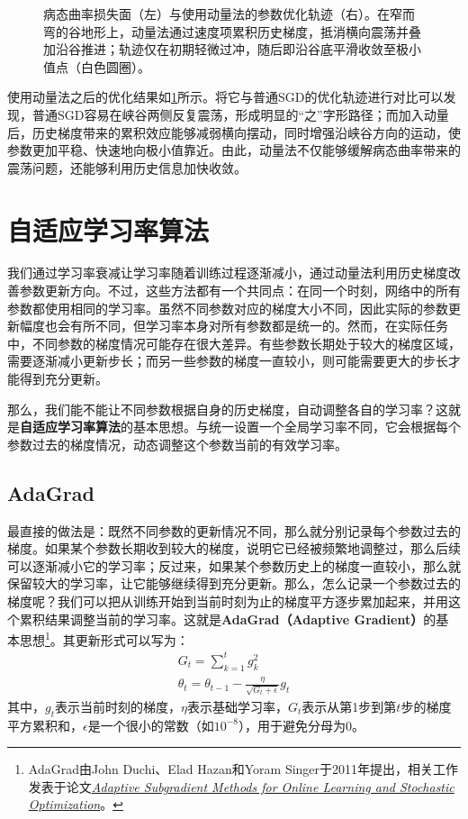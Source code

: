 \begin{figure}[H]
    \caption{病态曲率损失面（左）与使用动量法的参数优化轨迹（右）。在窄而弯的谷地形上，动量法通过速度项累积历史梯度，抵消横向震荡并叠加沿谷推进；轨迹仅在初期轻微过冲，随后即沿谷底平滑收敛至极小值点（白色圆圈）。}
    \label{fig:ill_conditioned_sovled}
\end{figure}

使用动量法之后的优化结果如\cref{fig:ill_conditioned_sovled}所示。将它与普通SGD的优化轨迹进行对比可以发现，普通SGD容易在峡谷两侧反复震荡，形成明显的“之”字形路径；而加入动量后，历史梯度带来的累积效应能够减弱横向摆动，同时增强沿峡谷方向的运动，使参数更加平稳、快速地向极小值靠近。由此，动量法不仅能够缓解病态曲率带来的震荡问题，还能够利用历史信息加快收敛。

\section{自适应学习率算法}

我们通过学习率衰减让学习率随着训练过程逐渐减小，通过动量法利用历史梯度改善参数更新方向。不过，这些方法都有一个共同点：在同一个时刻，网络中的所有参数都使用相同的学习率。虽然不同参数对应的梯度大小不同，因此实际的参数更新幅度也会有所不同，但学习率本身对所有参数都是统一的。然而，在实际任务中，不同参数的梯度情况可能存在很大差异。有些参数长期处于较大的梯度区域，需要逐渐减小更新步长；而另一些参数的梯度一直较小，则可能需要更大的步长才能得到充分更新。

那么，我们能不能让不同参数根据自身的历史梯度，自动调整各自的学习率？这就是\textbf{自适应学习率算法}的基本思想。与统一设置一个全局学习率不同，它会根据每个参数过去的梯度情况，动态调整这个参数当前的有效学习率。

\subsection{AdaGrad}

最直接的做法是：既然不同参数的更新情况不同，那么就分别记录每个参数过去的梯度。如果某个参数长期收到较大的梯度，说明它已经被频繁地调整过，那么后续可以逐渐减小它的学习率；反过来，如果某个参数历史上的梯度一直较小，那么就保留较大的学习率，让它能够继续得到充分更新。那么，怎么记录一个参数过去的梯度呢？我们可以把从训练开始到当前时刻为止的梯度平方逐步累加起来，并用这个累积结果调整当前的学习率。这就是\textbf{AdaGrad（Adaptive Gradient）}的基本思想\footnote{AdaGrad由John Duchi、Elad Hazan和Yoram Singer于2011年提出，相关工作发表于论文\href{http://jmlr.org/papers/v12/duchi11a.html}{\textit{Adaptive Subgradient Methods for Online Learning and Stochastic Optimization}}。}。其更新形式可以写为：
$$
\begin{gathered}
G_t = \sum_{k=1}^{t} g_k^2 \\
\theta_t = \theta_{t-1} - \frac{\eta}{\sqrt{G_t+\epsilon}}g_t
\end{gathered}
$$
其中，$g_t$表示当前时刻的梯度，$\eta$表示基础学习率，$G_t$表示从第1步到第$t$步的梯度平方累积和，$\epsilon$是一个很小的常数（如$10^{-8}$），用于避免分母为$0$。


